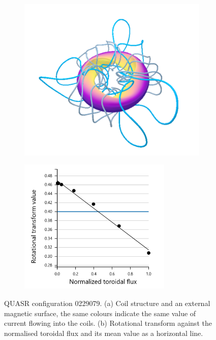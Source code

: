 \begin{figure}[H]
    \centering
    \begin{subfigure}[t]{0.49\textwidth}
        \centering
        \includegraphics[width=\textwidth]{images/quasrs/config-0229079.png}
        \caption{}
        \label{fig:coils-0229079}
    \end{subfigure}
    \hfill
    \begin{subfigure}[t]{0.49\textwidth}
        \centering
        \includegraphics[width=0.8\textwidth]{images/quasrs/iota-0229079.png}
        \caption{}
        \label{fig:iota-0229079}
    \end{subfigure}
    \caption{QUASR configuration 0229079. (a) Coil structure and an external magnetic surface, the same colours indicate the same value of current flowing into the coils. (b) Rotational transform against the normalised toroidal flux and its mean value as a horizontal line.}
    \label{fig:config-0229079}
\end{figure}

